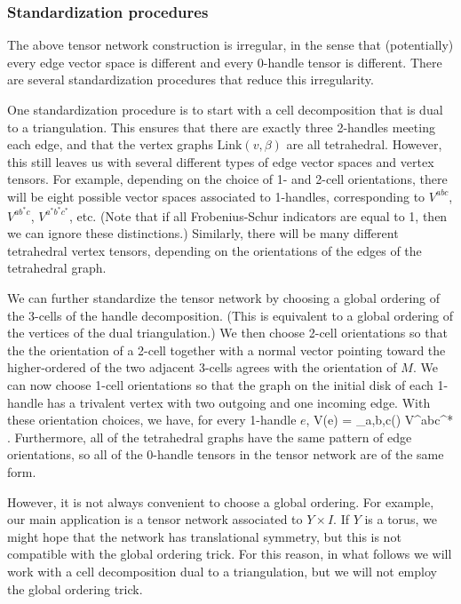 \subsubsection{Standardization procedures} \label{bosonic_standardization} 

The above tensor network construction is irregular, in the sense that (potentially) every edge vector space is different 
and every 0-handle tensor is different.
There are several standardization procedures that reduce this irregularity. 

One standardization procedure is to start with a cell decomposition that is dual to a triangulation.
This ensures that there are exactly three 2-handles meeting each edge, and that the vertex graphs $\text{Link}(v,\beta)$ are all tetrahedral.
However, this still leaves us with several different types of edge vector spaces and vertex tensors.
For example, depending on the choice of 1- and 2-cell orientations, there will be eight possible vector spaces associated to 1-handles,
corresponding to $V^{abc}$, $V^{ab^*c}$, $V^{a^*b^*c^*}$, etc.
(Note that if all Frobenius-Schur indicators are equal to 1, then we can ignore these distinctions.)
Similarly, there will be many different tetrahedral vertex tensors, depending on the orientations of the edges of the tetrahedral graph.

We can further standardize the tensor network by choosing a global ordering of the 3-cells of the handle decomposition.
(This is equivalent to a global ordering of the vertices of the dual triangulation.)
We then choose 2-cell orientations so that the the orientation of a 2-cell together with a normal vector pointing toward the higher-ordered of the two
adjacent 3-cells agrees with the orientation of $M$.
We can now choose 1-cell orientations so that the graph on the initial disk of each 1-handle has a trivalent vertex with two
outgoing and one incoming edge.
With these orientation choices, we have, for every 1-handle $e$,
\be
	V(e) = \bigoplus_{a,b,c\in\sob(\mcc)} V^{abc^*} .
\ee
Furthermore, all of the tetrahedral graphs have the same pattern of edge orientations, so all of the 0-handle tensors
in the tensor network are of the same form. 

However, it is not always convenient to choose a global ordering.
For example, our main application is a tensor network associated to $Y\times I$.
If $Y$ is a torus, we might hope that the network has translational symmetry, but this is not compatible with the global ordering trick.
For this reason, in what follows we will work with a cell decomposition dual to a triangulation, but we will not employ the global ordering trick.

